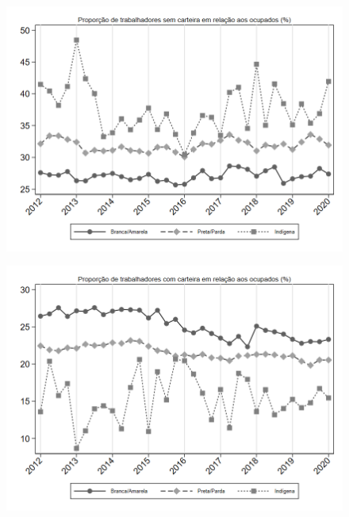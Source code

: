 \begin{frame}[label=_composicao_demografica_raca_prop_empregadoSC]{}
\textit{\hyperlink{_composicao_demografica_raca}{}}
\begin{figure}
  \centering
  \includegraphics[width=1.0\linewidth]{../../analysis/output/composicao_demografica/raca/_composicao_demografica_raca_prop_empregadoSC.png}
  \caption{}
  \label{fig:_composicao_demografica_raca_prop_empregadoSC}
\end{figure}
\end{frame}

\begin{frame}[label=_composicao_demografica_raca_prop_empregadoCC]{}
\textit{\hyperlink{_composicao_demografica_raca}{}}
\begin{figure}
  \centering
  \includegraphics[width=1.0\linewidth]{../../analysis/output/composicao_demografica/raca/_composicao_demografica_raca_prop_empregadoCC.png}
  \caption{}
  \label{fig:_composicao_demografica_raca_prop_empregadoCC}
\end{figure}
\end{frame}


